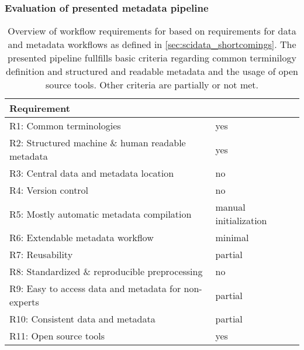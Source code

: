 \subsubsection{Evaluation of presented metadata pipeline}
\begin{table}[]
\begin{tabular}{|l|l|}
\hline
Requirement                                          &  \cite{Brochier_2018} \\  \hline
R1: Common terminologies                             &  yes \\ \hline
R2: Structured machine \& human readable metadata    &  yes \\ \hline
R3: Central data and metadata location               &  no \\ \hline
R4: Version control                                  &  no \\ \hline
R5: Mostly automatic metadata compilation            &  manual initialization \\ \hline
R6: Extendable metadata workflow                     &  minimal \\ \hline
R7: Reusability                                      &  partial \\ \hline
R8: Standardized \& reproducible preprocessing       &  no \\ \hline
R9: Easy to access data and metadata for non-experts &  partial \\ \hline
R10: Consistent data and metadata                    &  partial \\ \hline
R11: Open source tools                               &  yes \\ \hline
\end{tabular}
\caption[Overview of workflow requirements for \cite{Brochier_2018}]{Overview of workflow requirements for \cite{Brochier_2018} based on requirements for data and metadata workflows as defined in \ref{sec:scidata_shortcomings}. The presented pipeline fullfills basic criteria regarding common terminilogy definition and structured and readable metadata and the usage of open source tools. Other criteria are partially or not met.}
\label{tab:requirement_check_brochier}
\end{table}



% 
